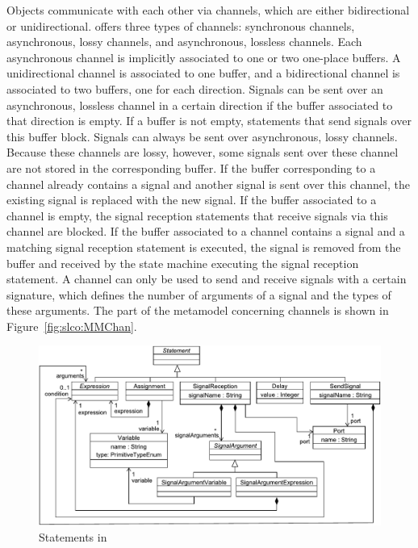 Objects communicate with each other via channels, which are either bidirectional or unidirectional.
\SLCO offers three types of channels: synchronous channels, asynchronous, lossy channels, and asynchronous, lossless channels.
Each asynchronous channel is implicitly associated to one or two one-place buffers.
A unidirectional channel is associated to one buffer, and a bidirectional channel is associated to two buffers, one for each direction.
Signals can be sent over an asynchronous, lossless channel in a certain direction if the buffer associated to that direction is empty.
If a buffer is not empty, statements that send signals over this buffer block.
Signals can always be sent over asynchronous, lossy channels.
Because these channels are lossy, however, some signals sent over these channel are not stored in the corresponding buffer.
If the buffer corresponding to a channel already contains a signal and another signal is sent over this channel, the existing signal is replaced with the new signal.
If the buffer associated to a channel is empty, the signal reception statements that receive signals via this channel are blocked.
If the buffer associated to a channel contains a signal and a matching signal reception statement is executed, the signal is removed from the buffer and received by the state machine executing the signal reception statement.
A channel can only be used to send and receive signals with a certain signature, which defines the number of arguments of a signal and the types of these arguments.
The part of the \SLCO metamodel concerning channels is shown in Figure~\ref{fig:slco:MMChan}.

\begin{figure}[hbt]
 \centering
 \includegraphics[scale=0.6]{slco/figs/metamodel/mm_slco_stat}
 \caption{Statements in \SLCO}
 \label{fig:slco:MMStatements}
\end{figure}

